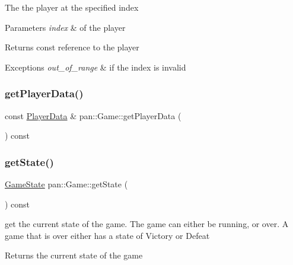 The the player at the specified index 
\begin{DoxyParams}{Parameters}
{\em index} & of the player \\
\hline
\end{DoxyParams}
\begin{DoxyReturn}{Returns}
const reference to the player 
\end{DoxyReturn}

\begin{DoxyExceptions}{Exceptions}
{\em out\+\_\+of\+\_\+range} & if the index is invalid \\
\hline
\end{DoxyExceptions}
\mbox{\label{classpan_1_1_game_a97050486b97c861c3d9d684bc95f0454}} 
\subsubsection{\texorpdfstring{get\+Player\+Data()}{getPlayerData()}}
{\footnotesize\ttfamily const \hyperlink{structpan_1_1_player_data}{Player\+Data} \& pan\+::\+Game\+::get\+Player\+Data (\begin{DoxyParamCaption}{ }\end{DoxyParamCaption}) const\hspace{0.3cm}{\ttfamily [inline]}}

\mbox{\label{classpan_1_1_game_a1cfa652ea64fb2cb16ded47cec2ea471}} 
\subsubsection{\texorpdfstring{get\+State()}{getState()}}
{\footnotesize\ttfamily \hyperlink{namespacepan_a6f99370eda3b27c2bbe19b2dacea9212}{Game\+State} pan\+::\+Game\+::get\+State (\begin{DoxyParamCaption}{ }\end{DoxyParamCaption}) const\hspace{0.3cm}{\ttfamily [inline]}}

get the current state of the game. The game can either be running, or over. A game that is over either has a state of Victory or Defeat \begin{DoxyReturn}{Returns}
the current state of the game 
\end{DoxyReturn}
\mbox{\label{classpan_1_1_game_a164829a91c20f0f1f7b2d32e76e370f2}} 
